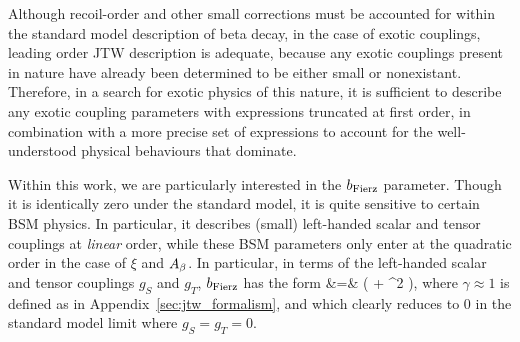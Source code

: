 Although recoil-order and other small corrections must be accounted for within the standard model description of beta decay, in the case of exotic couplings, leading order \ac{JTW} description is adequate, because any exotic couplings present in nature have already been determined to be either small or nonexistant.  Therefore, in a search for exotic physics of this nature, it is sufficient to describe any exotic coupling parameters with expressions truncated at first order, in combination with a more precise set of expressions to account for the well-understood physical behaviours that dominate.  

Within this work, we are particularly interested in the $b_{\mathrm{Fierz}}$ parameter.  Though it is identically zero under the standard model, it is quite sensitive to certain \ac{BSM} physics.  In particular, it describes (small) left-handed scalar and tensor couplings at \emph{linear} order, while these \ac{BSM} parameters only enter at the quadratic order in the case of $\xi$ and $A_{\beta}$.  In particular, in terms of the left-handed scalar and tensor couplings $g_S$ and $g_T$, $b_{\mathrm{Fierz}}$ has the form 
\bea
\bFierz &=&  \left(  + \rho^2  \right), 
\eea
where $\gamma \approx 1$ is defined as in Appendix~\ref{sec:jtw_formalism}, and
which clearly reduces to 0 in the standard model limit where $g_S = g_T = 0$.









